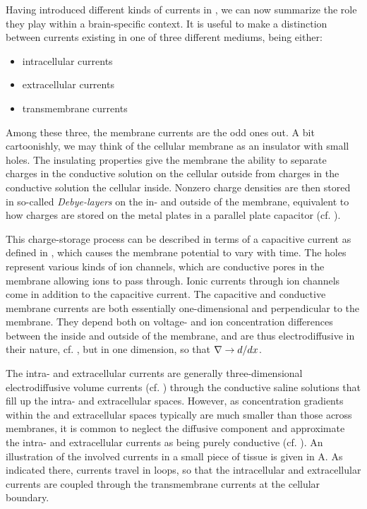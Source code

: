 Having introduced different kinds of currents in , we can now summarize the role they play within a brain-specific context. It is useful to make a distinction between currents existing in one of three different mediums, being either:
\begin{itemize}
\item intracellular currents 
\item extracellular currents 
\item transmembrane currents  
\end{itemize}

Among these three, the membrane currents are the odd ones out. A bit cartoonishly, we may think of the cellular membrane as an insulator with small holes. The insulating properties give the membrane the ability to separate charges in the conductive solution on the cellular outside from charges in the conductive solution the cellular inside. Nonzero charge densities are then stored in so-called \textit{Debye-layers} on the in- and outside of the membrane, equivalent to how charges are stored on the metal plates in a parallel plate capacitor (cf. ). 

This charge-storage process can be described in terms of a capacitive current as defined in , which causes the membrane potential to vary with time. The holes represent various kinds of ion channels, which are conductive pores in the membrane allowing ions to pass through. Ionic currents through ion channels come in addition to the capacitive current. The capacitive and conductive membrane currents are both essentially one-dimensional and perpendicular to the membrane. They depend both on voltage- and ion concentration differences between the inside and outside of the membrane, and are thus electrodiffusive in their nature, cf. , but in one dimension, so that ${\bf \nabla} \rightarrow d/dx$.

The intra- and extracellular currents are generally three-dimensional electrodiffusive volume currents (cf. ) through the conductive saline solutions that fill up the intra- and extracellular spaces. However, as concentration gradients within the  and extracellular spaces typically are much smaller than those across membranes, it is common to neglect the diffusive component and approximate the intra- and extracellular currents as being purely conductive (cf. ). An illustration of the involved currents in a small piece of tissue is given in A. As indicated there, currents travel in loops, so that the intracellular and extracellular currents are coupled through the transmembrane currents at the cellular boundary. 

